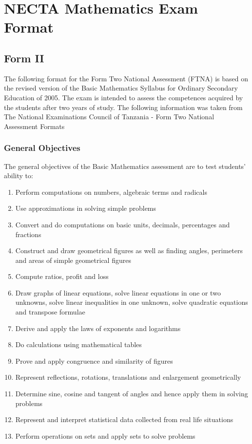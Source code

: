\section{NECTA Mathematics Exam Format}
\label{sec:math-format}

\subsection{Form II}
\noindent The following format for the Form Two National Assessment (FTNA) is based on the revised version of the Basic Mathematics Syllabus for Ordinary Secondary Education of 2005. The exam is intended to assess the competences acquired by the students after two years of study. The following information was taken from The National Examinations Council of Tanzania - Form Two National Assessment Formats %

\subsubsection{General Objectives}
\noindent The general objectives of the Basic Mathematics assessment are to test students' ability to:
\begin{enumerate}[topsep=1ex,itemsep=0ex,partopsep=1ex,parsep=1ex]
	\item Perform computations on numbers, algebraic terms and radicals
	\item Use approximations in solving simple problems
	\item Convert and do computations on basic units, decimals, percentages and fractions
	\item Construct and draw geometrical figures as well as finding angles, perimeters and areas of simple geometrical figures
	\item Compute ratios, profit and loss
	\item Draw graphs of linear equations, solve linear equations in one or two unknowns, solve linear inequalities in one unknown, solve quadratic equations and transpose formulae
	\item Derive and apply the laws of exponents and logarithms
	\item Do calculations using mathematical tables
	\item Prove and apply congruence and similarity of figures
	\item Represent reflections, rotations, translations and enlargement geometrically
	\item Determine sine, cosine and tangent of angles and hence apply them in solving problems
	\item Represent and interpret statistical data collected from real life situations
	\item Perform operations on sets and apply sets to solve problems
\end{enumerate}

